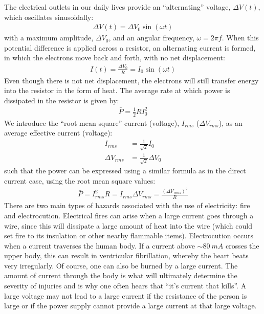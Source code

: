 \begin{chapterSummary}
The electrical outlets in our daily lives provide an ``alternating'' voltage, $\Delta V(t)$, which oscillates sinusoidally:
\begin{align*}
\Delta V(t)=\Delta V_0\sin(\omega t)
\end{align*}
with a maximum amplitude, $\Delta V_0$, and an angular frequency, $\omega = 2\pi f$. When this potential difference is applied across a resistor, an alternating current is formed, in which the electrons move back and forth, with no net displacement:
\begin{align*}
I(t)=\frac{\Delta V_0}{R}=I_0\sin(\omega t)
\end{align*}
Even though there is not net displacement, the electrons will still transfer energy into the resistor in the form of heat. The average rate at which power is dissipated in the resistor is given by:
\begin{align*}
\bar P=\frac{1}{2}RI_0^2
\end{align*}
We introduce the ``root mean square'' current (voltage), $I_{rms}$ ($\Delta V_{rms}$), as an average effective current (voltage):
\begin{align*}
I_{rms}&=\frac{1}{\sqrt 2}I_0\\
\Delta V_{rms}&=\frac{1}{\sqrt 2}\Delta V_0
\end{align*}
such that the power can be expressed using a similar formula as in the direct current case, using the root mean square values:
\begin{align*}
\bar P = I_{rms}^2R = I_{rms}\Delta V_{rms}=\frac{(\Delta V_{Rms})^2}{R}
\end{align*}
There are two main types of hazards associated with the use of electricity: fire and electrocution. Electrical fires can arise when a large current goes through a wire, since this will dissipate a large amount of heat into the wire (which could set fire to its insulation or other nearby flammable items). Electrocution occurs when a current traverses the human body. If a current above $\sim\SI{80}{mA}$ crosses the upper body, this can result in ventricular fibrillation, whereby the heart beats very irregularly. Of course, one can also be burned by a large current. The amount of current through the body is what will ultimately determine the severity of injuries and is why one often hears that ``it's current that kills''. A large voltage may not lead to a large current if the resistance of the person is large or if the power supply cannot provide a large current at that large voltage.
\end{chapterSummary}
